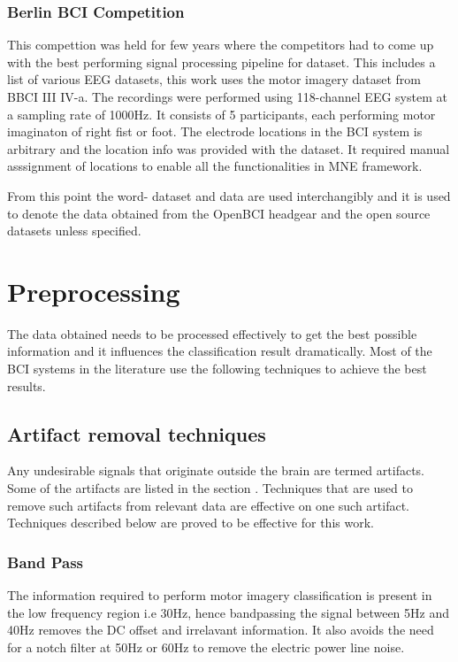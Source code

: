 \subsubsection{Berlin BCI Competition}
    This compettion was held for few years where the competitors had to come up with the best performing signal processing pipeline for dataset. This includes a list of various
EEG datasets, this work uses the motor imagery dataset from BBCI III IV-a. The recordings were performed using 118-channel EEG system at a sampling rate of 1000Hz. It consists
of 5 participants, each performing motor imaginaton of right fist or foot. The electrode locations in the BCI system is arbitrary and the location info was provided with the dataset.
It required manual asssignment of locations to enable all the functionalities in MNE framework.

From this point the word- dataset and data are used interchangibly and it is used to denote the data obtained from the OpenBCI headgear and the open source datasets unless specified.

\section{Preprocessing}
The data obtained needs to be processed effectively to get the best possible information and it influences the classification result dramatically. Most of the BCI systems in the
literature use the following techniques to achieve the best results. 

\subsection{Artifact removal techniques}
    Any undesirable signals that originate outside the brain  are termed artifacts. Some of the artifacts are listed in the section \sec. Techniques that are used to remove such
artifacts from relevant data are effective on one such artifact. Techniques described below are proved to be effective for this work. 

\subsubsection{Band Pass}
The information required to perform motor imagery classification is present in the low frequency region i.e 30Hz, hence bandpassing the signal between 5Hz and 40Hz removes the DC 
offset and irrelavant information. It also avoids the need for a notch filter at 50Hz or 60Hz to remove the electric power line noise. 

